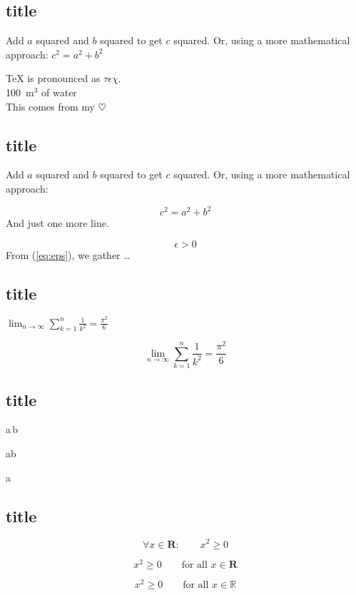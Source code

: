 \documentclass[UTF8]{ctexart}
\begin{document}
\subsection{title}
Add $a$ squared and $b$ squared
to get $c$ squared. Or, using
a more mathematical approach:
$c^{2}=a^{2}+b^{2}$


\TeX{} is pronounced as
$\tau\epsilon\chi$.\\[20pt]
100~m$^{3}$ of water\\[6pt]
This comes from my $\heartsuit$

\subsection{title}
Add $a$ squared and $b$ squared
to get $c$ squared. Or, using
a more mathematical approach:

\[
c^{2}=a^{2}+b^{2}
\]
And just one more line.

\begin{equation} \label{eq:eps}
\epsilon > 0
\end{equation}
From (\ref{eq:eps}), we gather
\ldots

\subsection{title}
$\lim_{n \to \infty}
\sum_{k=1}^n \frac{1}{k^2}
= \frac{\pi^2}{6}
$

\begin{displaymath}
\lim_{n \to \infty}
\sum_{k=1}^n \frac{1}{k^2}
= \frac{\pi^2}{6}
\end{displaymath}

\subsection{title}
a\,b

a\qquad b

a\quad 
\subsection{title}
\begin{equation}
\forall x \in \mathbf{R}:
\qquad x^{2} \geq 0
\end{equation}

\begin{equation}
x^{2} \geq 0\qquad
\textrm{for all }x\in\mathbf{R}
\end{equation}

\begin{displaymath}
x^{2} \geq 0\qquad
\textrm{for all }x\in\mathbb{R}
\end{displaymath}
\end{document}
